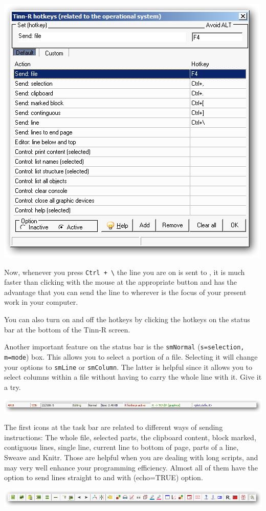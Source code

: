 \includegraphics[scale=0.50]{./res/hotkeys_default.png}

Now, whenever you press \texttt{Ctrl + \textbackslash{}} the line you are on is sent to \RR{},
it is much faster than clicking with the mouse at the appropriate button and has the advantage
that you can send the line to \RR{} wherever is the focus of your present work in your computer.

You can also turn on and off the hotkeys by clicking the hotkeys on the status bar at the bottom of the Tinn-R screen.

Another important feature on the status bar is the \texttt{smNormal} (\texttt{s=selection, m=mode}) box.
This allows you to select a portion of a file.
Selecting it will change your options to \texttt{smLine} or \texttt{smColumn}.
The latter is helpful since it allows you to select columns within a file without having to carry the whole line with it.
Give it a try.

\includegraphics[scale=0.50]{./res/secrets_statusbar.png}

The first icons at the \RR{} task bar are related to different ways of sending instructions:
The whole file, selected parts, the clipboard content, block marked, contiguous lines, single line,
current line to bottom of page, parts of a line, Sweave and Knitr.
Those are helpful when you are dealing with long scripts,
and may very well enhance your programming efficiency.
Almost all of them have the option to send lines straight to \RR{} and with (echo=TRUE) option.

\includegraphics[scale=0.50]{./res/secrets_rtoolbar.png}

